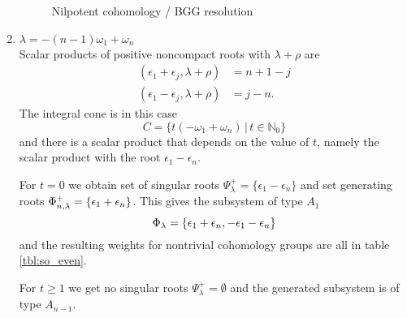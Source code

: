\begin{enumerate}
 
\begin{figure}[H]
  \centering
{}
  \caption{Nilpotent cohomology / BGG resolution}
\end{figure}
  
 \item $ \lambda = -(n-1)\omega_1 + \omega_n$\\
  Scalar products of positive noncompact roots with $\lambda+\rho$ are
  \begin{align*}
    (\epsilon_1 + \epsilon_j, \lambda+\rho) & = n+1-j\\
    (\epsilon_1 - \epsilon_j, \lambda+\rho) & = j-n.
  \end{align*}
  The integral cone is in this case \[C = \{t(-\omega_1 + \omega_n) \,|\, t\in\mathbb{N}_0 \}\] and there is a scalar product that depends on the value of $t$, namely the scalar product with the root $\epsilon_1 - \epsilon_n.$
  
  For $t=0$ we obtain set of singular roots $\Psi^+_\lambda = \{ \epsilon_1-\epsilon_n\}$ and set generating roots $\Phi^+_{n,\lambda} = \{ \epsilon_1 + \epsilon_n \}$. This gives the subsystem of type $A_1$
  \[
   \Phi_\lambda = \{ \epsilon_1 + \epsilon_n, -\epsilon_1 - \epsilon_n\}
  \]
  and the resulting weights for nontrivial cohomology groups are all in table \ref{tbl:so_even}. 
  
  For $t\geq 1$ we get no singular roots $\Psi^+_\lambda = \emptyset$ and the generated subsystem is of type $A_{n-1}.$


\end{enumerate}
